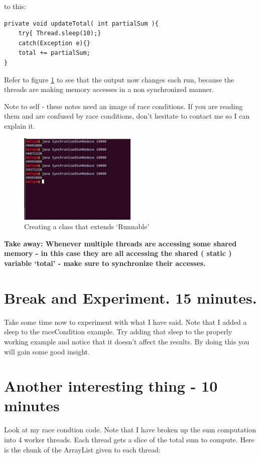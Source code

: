 \documentclass[12pt]{article}
\begin{document}
to this:

\begin{lstlisting}
private void updateTotal( int partialSum ){
	try{ Thread.sleep(10);}
	catch(Exception e){}
	total += partialSum;
}
\end{lstlisting}

Refer to figure \ref{raceCondition} to see that the output now changes each run,
because the threads are making memory accesses in a non synchronized manner.

Note to self - these notes need an image of race conditions. If you are reading
them and are confused by race conditions, don't hesitate to contact me so I can
explain it.

\begin{figure}[ht]
  \label{raceCondition}
  \centering
    \includegraphics[width=0.5\textwidth]{Images/raceCondition.png}
  \caption{Creating a class that extends `Runnable'}
\end{figure}

{\Large\textbf{Take away: Whenever multiple threads are accessing some shared
memory - in this case they are all accessing the shared ( static ) variable
`total' - make sure to  synchronize their accesses.}}

\section{Break and Experiment. 15 minutes.}
Take some time now to experiment with what I have said. Note that I added a
sleep to the raceCondition example. Try adding that sleep to the properly
working example and notice that it doesn't affect the results. By doing this you
will gain some good insight.

\section{ Another interesting thing - 10 minutes }
Look at my race condtion code. Note that I have broken up the sum computation
into 4 worker threads. Each thread gets a slice of the total sum to compute.
Here is the chunk of the ArrayList given to each thread:
\end{document}
